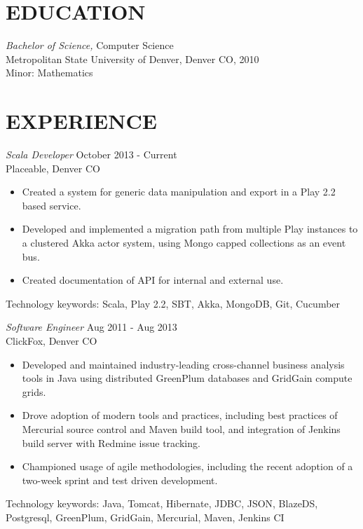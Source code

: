 \documentclass[line,margin]{res}
\begin{document}
\address{2020 Lawrence St \#830, Denver CO 80205}
\address{720-301-4407 / zoe@zgagnon.com}

 
\begin{resume}
 
\section{EDUCATION} {\sl Bachelor of Science,} Computer Science \\
               Metropolitan State University of Denver, Denver CO, 2010 \\
               Minor: Mathematics
 
\section{EXPERIENCE}
{\sl Scala Developer} \hfil October 2013 - Current\\
Placeable, Denver CO
\begin{itemize} \itemsep -2pt
\item Created a system for generic data manipulation and export in a Play 2.2 based service.
\item Developed and implemented a migration path from multiple Play instances to a clustered Akka actor system, using Mongo
capped collections as an event bus.
\item Created documentation of API for internal and external use.
\end{itemize}
Technology keywords: Scala, Play 2.2, SBT, Akka, MongoDB, Git, Cucumber

 {\sl Software Engineer} \hfill Aug 2011 - Aug 2013 \\
	      ClickFox, Denver CO
                 \begin{itemize}  \itemsep -2pt %
                 \item Developed and maintained industry-leading cross-channel business analysis tools in Java using distributed GreenPlum databases and GridGain compute grids.
                \item Drove adoption of modern tools and practices, including best practices of Mercurial source control and Maven build tool, 
                and integration of Jenkins build server with Redmine issue tracking.
   	    \item  Championed usage of agile methodologies, including the recent adoption of a two-week sprint and test driven development.
\end{itemize}
	Technology keywords: Java, Tomcat, Hibernate, JDBC, JSON, BlazeDS, Postgresql, GreenPlum, GridGain, Mercurial, Maven, Jenkins CI
                

\end{resume}
\end{document}
